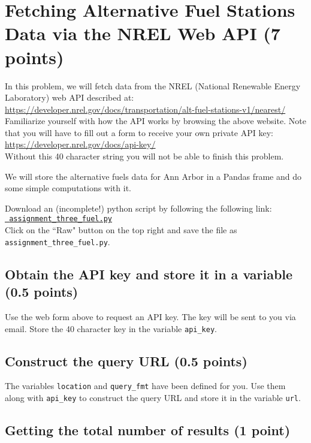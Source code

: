 \documentclass{article}
\begin{document}
\section{Fetching Alternative Fuel Stations Data via the NREL Web API (7 points)}

In this problem, we will fetch data from the NREL (National Renewable Energy Laboratory) web API described at:\\
\url{https://developer.nrel.gov/docs/transportation/alt-fuel-stations-v1/nearest/} \\
Familiarize yourself with how the API works by browsing the above website. Note that you will have to fill out a form to receive your own private API key:\\
\url{https://developer.nrel.gov/docs/api-key/}\\
Without this 40 character string you will not be able to finish this problem.

We will store the alternative fuels data for Ann Arbor in a Pandas frame and do some simple computations with it.

Download an (incomplete!) python script by following the following
link:\\
\href{https://github.com/ambujtewari/stats607a-fall2017/blob/master/homeworks/assignment_three_fuel.py}{\tt
assignment\_three\_fuel.py} \\
Click on the ``Raw" button on the top right and save the file as {\tt
assignment\_three\_fuel.py}.

\subsection{Obtain the API key and store it in a variable (0.5 points)}

Use the web form above to request an API key. The key will be sent to you via email. Store the 40 character key
in the variable {\tt api\_key}.

\subsection{Construct the query URL (0.5 points)}

The variables {\tt location} and {\tt query\_fmt} have been defined for you. Use them along with {\tt api\_key} to construct the query URL
and store it in the variable {\tt url}.

\subsection{Getting the total number of results (1 point)}
\end{document}
